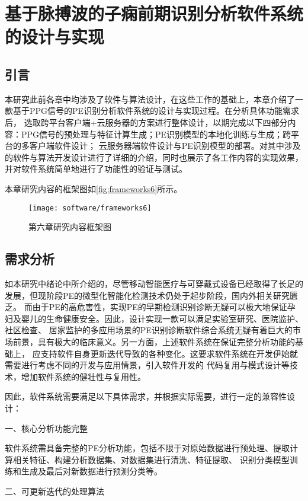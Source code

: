 \chapter{基于脉搏波的子痫前期识别分析软件系统的设计与实现}
\section{引言}
本研究此前各章中均涉及了软件与算法设计，在这些工作的基础上，本章介绍了一款基于PPG信号的PE识别分析软件系统的设计与实现过程。在分析具体功能需求后，
选取跨平台客户端+云服务器的方案进行整体设计，以期完成以下四部分内容：PPG信号的预处理与特征计算生成；PE识别模型的本地化训练与生成；跨平台的多客户端软件设计；
云服务器端软件设计与PE识别模型的部署。对其中涉及的软件与算法开发设计进行了详细的介绍，同时也展示了各工作内容的实现效果，
并对软件系统简单地进行了功能性的验证与测试。

本章研究内容的框架图如\autoref{fig:frameworks6}所示。

\begin{figure}[htbp]
    \centering
    \texttt{[image: software/frameworks6]}
    \caption{\label{fig:frameworks6}第六章研究内容框架图}
\end{figure}

\section{需求分析}
如本研究中绪论中所介绍的，尽管移动智能医疗与可穿戴式设备已经取得了长足的发展，但现阶段PE的微型化智能化检测技术仍处于起步阶段，国内外相关研究匮乏。
而由于PE的高危害性，实现PE的早期检测识别诊断无疑可以极大地保证孕妇及婴儿的生命健康安全。因此，设计实现一款可以满足实验室研究、医院监护、社区检查、
居家监护的多应用场景的PE识别诊断软件综合系统无疑有着巨大的市场前景，具有极大的临床意义。另一方面，上述软件系统在保证完整分析功能的基础上，
应支持软件自身更新迭代导致的各种变化。这要求软件系统在开发伊始就需要进行考虑不同的开发与应用情景，引入软件开发的
代码复用与模式设计等技术，增加软件系统的健壮性与复用性\cite{Enrich2018,CJ2020}。

因此，软件系统需要满足以下具体需求，并根据实际需要，进行一定的兼容性设计：

一、核心分析功能完整

软件系统需具备完整的PE分析功能，包括不限于对原始数据进行预处理、提取计算相关特征、构建分析数据集、对数据集进行清洗、特征提取、
识别分类模型训练和生成及最后对新数据进行预测分类等。

二、可更新迭代的处理算法

